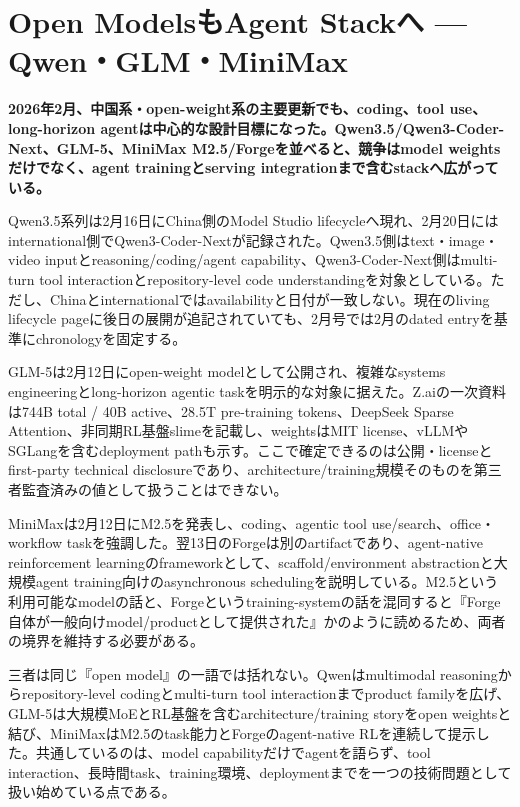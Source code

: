\section{Open ModelsもAgent Stackへ — Qwen・GLM・MiniMax}
\noindent\textbf{2026年2月、中国系・open-weight系の主要更新でも、coding、tool use、long-horizon agentは中心的な設計目標になった。Qwen3.5/Qwen3-Coder-Next、GLM-5、MiniMax M2.5/Forgeを並べると、競争はmodel weightsだけでなく、agent trainingとserving integrationまで含むstackへ広がっている。}\autocite{src-9156c37fb1c2,src-d8e13386974c,src-eac8dfbeb78c}

Qwen3.5系列は2月16日にChina側のModel Studio lifecycleへ現れ、2月20日にはinternational側でQwen3-Coder-Nextが記録された。Qwen3.5側はtext・image・video inputとreasoning/coding/agent capability、Qwen3-Coder-Next側はmulti-turn tool interactionとrepository-level code understandingを対象としている。ただし、Chinaとinternationalではavailabilityと日付が一致しない。現在のliving lifecycle pageに後日の展開が追記されていても、2月号では2月のdated entryを基準にchronologyを固定する。\autocite{src-eac8dfbeb78c}


GLM-5は2月12日にopen-weight modelとして公開され、複雑なsystems engineeringとlong-horizon agentic taskを明示的な対象に据えた。Z.aiの一次資料は744B total / 40B active、28.5T pre-training tokens、DeepSeek Sparse Attention、非同期RL基盤slimeを記載し、weightsはMIT license、vLLMやSGLangを含むdeployment pathも示す。ここで確定できるのは公開・licenseとfirst-party technical disclosureであり、architecture/training規模そのものを第三者監査済みの値として扱うことはできない。\autocite{src-9156c37fb1c2}


MiniMaxは2月12日にM2.5を発表し、coding、agentic tool use/search、office・workflow taskを強調した。翌13日のForgeは別のartifactであり、agent-native reinforcement learningのframeworkとして、scaffold/environment abstractionと大規模agent training向けのasynchronous schedulingを説明している。M2.5という利用可能なmodelの話と、Forgeというtraining-systemの話を混同すると『Forge自体が一般向けmodel/productとして提供された』かのように読めるため、両者の境界を維持する必要がある。\autocite{src-d8e13386974c}


三者は同じ『open model』の一語では括れない。Qwenはmultimodal reasoningからrepository-level codingとmulti-turn tool interactionまでproduct familyを広げ、GLM-5は大規模MoEとRL基盤を含むarchitecture/training storyをopen weightsと結び、MiniMaxはM2.5のtask能力とForgeのagent-native RLを連続して提示した。共通しているのは、model capabilityだけでagentを語らず、tool interaction、長時間task、training環境、deploymentまでを一つの技術問題として扱い始めている点である。\autocite{src-9156c37fb1c2,src-d8e13386974c,src-eac8dfbeb78c}


